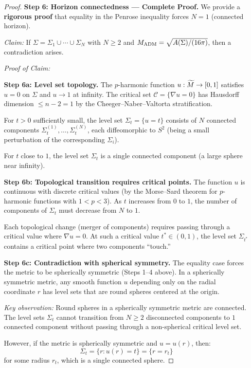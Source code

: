 \begin{proof}
\textbf{Step 6: Horizon connectedness --- Complete Proof.}
We provide a \textbf{rigorous proof} that equality in the Penrose inequality forces $N = 1$ (connected horizon).

\textit{Claim:} If $\Sigma = \Sigma_1 \cup \cdots \cup \Sigma_N$ with $N \ge 2$ and $M_{\mathrm{ADM}} = \sqrt{A(\Sigma)/(16\pi)}$, then a contradiction arises.

\textit{Proof of Claim:}

\textbf{Step 6a: Level set topology.}
The $p$-harmonic function $u: \widetilde{M} \to [0,1]$ satisfies $u = 0$ on $\Sigma$ and $u \to 1$ at infinity. The critical set $\mathcal{C} = \{\nabla u = 0\}$ has Hausdorff dimension $\le n-2 = 1$ by the Cheeger--Naber--Valtorta stratification.

For $t > 0$ sufficiently small, the level set $\Sigma_t = \{u = t\}$ consists of $N$ connected components $\Sigma_t^{(1)}, \ldots, \Sigma_t^{(N)}$, each diffeomorphic to $S^2$ (being a small perturbation of the corresponding $\Sigma_i$).

For $t$ close to $1$, the level set $\Sigma_t$ is a single connected component (a large sphere near infinity).

\textbf{Step 6b: Topological transition requires critical points.}
The function $u$ is continuous with discrete critical values (by the Morse--Sard theorem for $p$-harmonic functions with $1 < p < 3$). As $t$ increases from $0$ to $1$, the number of components of $\Sigma_t$ must decrease from $N$ to $1$.

Each topological change (merger of components) requires passing through a critical value where $\nabla u = 0$. At such a critical value $t^* \in (0,1)$, the level set $\Sigma_{t^*}$ contains a critical point where two components ``touch.''

\textbf{Step 6c: Contradiction with spherical symmetry.}
The equality case forces the metric to be spherically symmetric (Steps 1--4 above). In a spherically symmetric metric, any smooth function $u$ depending only on the radial coordinate $r$ has level sets that are round spheres centered at the origin.

\textit{Key observation:} Round spheres in a spherically symmetric metric are connected. The level sets $\Sigma_t$ cannot transition from $N \ge 2$ disconnected components to $1$ connected component without passing through a non-spherical critical level set.

However, if the metric is spherically symmetric and $u = u(r)$, then:
\begin{equation}
    \Sigma_t = \{r : u(r) = t\} = \{r = r_t\}
\end{equation}
for some radius $r_t$, which is a single connected sphere.


\end{proof}
